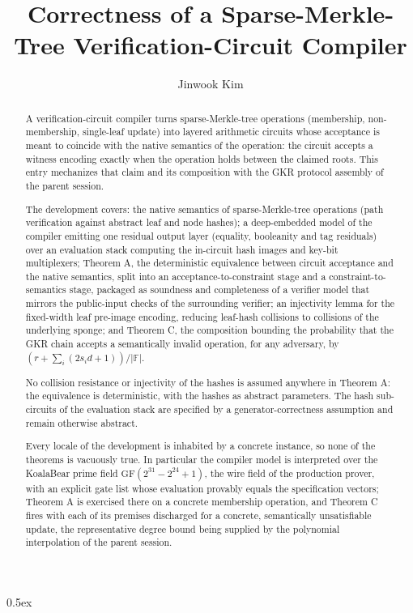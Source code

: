 \documentclass[11pt,a4paper]{article}
\begin{document}
\title{Correctness of a Sparse-Merkle-Tree Verification-Circuit Compiler}
\author{Jinwook Kim}

\maketitle

\begin{abstract}
A verification-circuit compiler turns sparse-Merkle-tree operations
(membership, non-membership, single-leaf update) into layered
arithmetic circuits whose acceptance is meant to coincide with the
native semantics of the operation: the circuit accepts a witness
encoding exactly when the operation holds between the claimed roots.
This entry mechanizes that claim and its composition with the GKR
protocol assembly of the parent session.

The development covers: the native semantics of sparse-Merkle-tree
operations (path verification against abstract leaf and node hashes);
a deep-embedded model of the compiler emitting one residual output
layer (equality, booleanity and tag residuals) over an evaluation
stack computing the in-circuit hash images and key-bit multiplexers;
Theorem A, the deterministic equivalence between circuit acceptance
and the native semantics, split into an acceptance-to-constraint stage
and a constraint-to-semantics stage, packaged as soundness and
completeness of a verifier model that mirrors the public-input checks
of the surrounding verifier; an injectivity lemma for the fixed-width
leaf pre-image encoding, reducing leaf-hash collisions to collisions
of the underlying sponge; and Theorem C, the composition bounding the
probability that the GKR chain accepts a semantically invalid
operation, for any adversary, by
$(r + \sum_i (2 s_i d + 1))/|\mathbb{F}|$.

No collision resistance or injectivity of the hashes is assumed
anywhere in Theorem A: the equivalence is deterministic, with the
hashes as abstract parameters.  The hash sub-circuits of the
evaluation stack are specified by a generator-correctness assumption
and remain otherwise abstract.

Every locale of the development is inhabited by a concrete instance, so
none of the theorems is vacuously true.  In particular the compiler
model is interpreted over the KoalaBear prime field
$\mathrm{GF}(2^{31} - 2^{24} + 1)$, the wire field of the production
prover, with an explicit gate list whose evaluation provably equals the
specification vectors; Theorem A is exercised there on a concrete
membership operation, and Theorem C fires with each of its premises
discharged for a concrete, semantically unsatisfiable update, the
representative degree bound being supplied by the polynomial
interpolation of the parent session.
\end{abstract}

\tableofcontents

\newpage

\parindent 0pt\parskip 0.5ex


\end{document}
